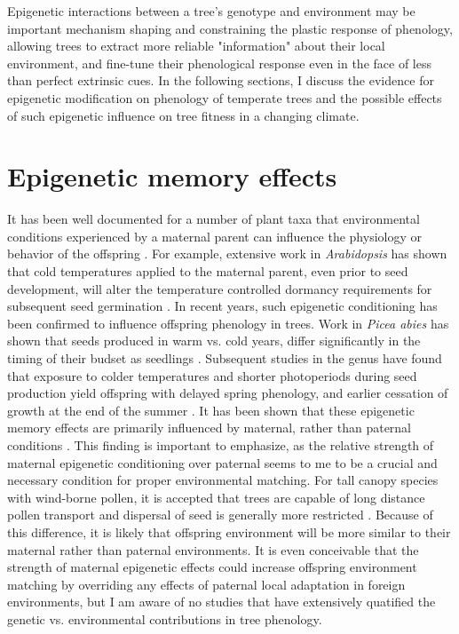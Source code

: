\documentclass{article}\usepackage[]{graphicx}\usepackage[]{color}
\begin{document}
\par Epigenetic interactions between a tree's genotype and environment may be important mechanism shaping and constraining the plastic response of phenology, allowing trees to extract more reliable "information" about their local environment, and fine-tune their phenological response even in the face of less than perfect extrinsic cues. In the following sections, I discuss the evidence for epigenetic modification on phenology of temperate trees and the possible effects of such epigenetic influence on tree fitness in a changing climate.
\section{Epigenetic memory effects}
\par It has been well documented for a number of plant taxa that environmental conditions experienced by a maternal parent can influence the physiology or behavior of the offspring \citep{}. For example, extensive work in \textit{Arabidopsis} has shown that cold temperatures applied to the maternal parent, even prior to seed development, will alter the temperature controlled dormancy requirements for subsequent seed germination \citep{Auge2017}. In recent years, such epigenetic conditioning has been confirmed to influence offspring phenology in trees. Work in \textit{Picea abies} has shown that seeds produced in warm vs. cold years, differ significantly in the timing of their budset as seedlings \citep{Kohmann1994}. Subsequent studies in the genus have found that exposure to colder temperatures and shorter photoperiods during seed production yield offspring with delayed spring phenology, and earlier cessation of growth at the end of the summer \citep{Johnsen2005, Gomery2014}. It has been shown that these epigenetic memory effects are primarily influenced by maternal, rather than paternal conditions \citep{Johnsen1996}. This finding is important to emphasize, as the relative strength of maternal epigenetic conditioning over paternal seems to me to be a crucial and necessary condition for proper environmental matching. For tall canopy species with wind-borne pollen, it is accepted that trees are capable of long distance pollen transport and dispersal of seed is generally more restricted \citep{}. Because of this difference, it is likely that offspring environment will be more similar to their maternal rather than paternal environments. It is even conceivable that the strength of maternal epigenetic effects could increase offspring environment matching by overriding any effects of paternal local adaptation in foreign environments, but I am aware of no studies that have extensively quatified the  genetic vs. environmental contributions in tree phenology.
\end{document}

